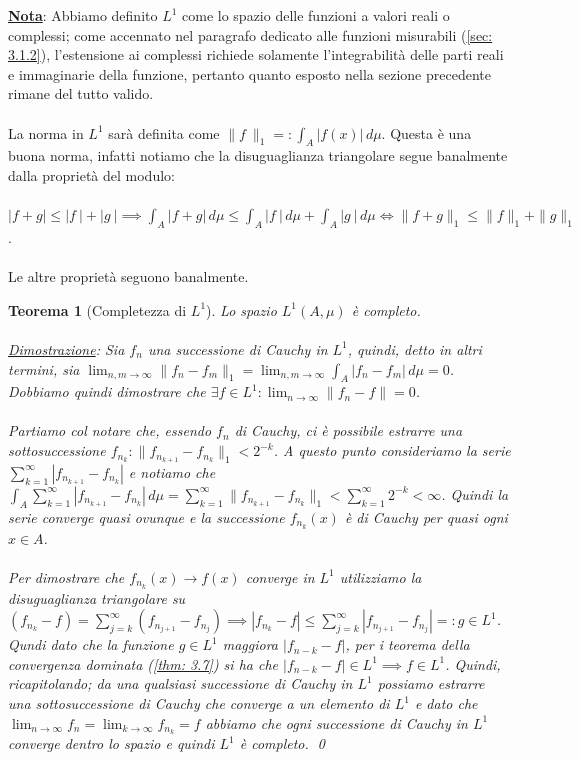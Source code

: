 \documentclass[a4paper,12pt]{report}
\newtheorem{teorema}{Teorema}[chapter]
\newcommand{\lt}{<}
\begin{document}
\underline{\textbf{Nota}}: Abbiamo definito $L^1$ come lo spazio delle funzioni a valori reali o complessi; come accennato nel paragrafo dedicato alle funzioni misurabili (\ref{sec: 3.1.2}), l'estensione ai complessi richiede solamente l'integrabilità delle parti reali e immaginarie della funzione, pertanto quanto esposto nella sezione precedente rimane del tutto valido.
\\
\\La norma in $L^1$ sarà definita come $\|f \ \|_1=:\displaystyle\int_A|f(x) |\,d\mu$. Questa è una buona norma, infatti notiamo che la disuguaglianza triangolare segue banalmente dalla proprietà del modulo: 
\\
\\$|f+g|\leq|f \ |+|g \ | \implies \displaystyle \int_A|f+g|\,d\mu\leq\int_A|f \ |\,d\mu+\int_A|g\ |\,d\mu \iff\|f+g\|_1\leq \|f\|_1+\|g\|_1$.
\\
\\ Le altre proprietà seguono banalmente.

\begin{teorema}[Completezza di $L^1$]\label{thm: 3.8}
    Lo spazio $L^1(A,\mu)$ è completo.
    \\
    \\ \underline{Dimostrazione}: Sia $f_n$ una successione di Cauchy in $L^1$, quindi, detto in altri termini, sia $\displaystyle\lim_{n,m\to\infty}\|f_n-f_m\|_1=\lim_{n,m\to\infty}\int_A|f_n-f_m|\,d\mu=0$. Dobbiamo quindi dimostrare che $\exists f\in L^1 : \displaystyle\lim_{n\to\infty}\|f_n-f\|=0$.
    \\
    \\Partiamo col notare che, essendo $f_n$ di Cauchy, ci è possibile estrarre una sottosuccessione $f_{n_k}: \|f_{n_{k+1}}-f_{n_k}\|_1\lt 2^{-k}$. A questo punto consideriamo la serie $\displaystyle \sum_{k=1}^\infty|f_{n_{k+1}}-f_{n_k}|$ e notiamo che $\displaystyle\int_A\sum_{k=1}^\infty|f_{n_{k+1}}-f_{n_k}|\,d\mu=\sum_{k=1}^\infty\|f_{n_{k+1}}-f_{n_k}\|_1\lt \sum_{k=1}^\infty 2^{-k}\lt \infty$. Quindi la serie converge quasi ovunque e la successione $f_{n_k}(x)$ è di Cauchy per quasi ogni $x\in A$.
    \\
    \\ Per dimostrare che $f_{n_k}(x)\to f(x)$ converge in $L^1$ utilizziamo la disuguaglianza triangolare su $(f_{n_k}-f)=\displaystyle\sum_{j=k}^\infty(f_{n_{j+1}}-f_{n_j})\implies|f_{n_k}-f|\leq\displaystyle\sum_{j=k}^\infty|f_{n_{j+1}}-f_{n_j}|=:g\in L^1$. Qundi dato che la funzione $g\in L^1$ maggiora $|f_{n-k}-f|$, per i teorema della convergenza dominata (\ref{thm: 3.7}) si ha che $|f_{n-k}-f|\in L^1\implies f\in L^1$. Quindi, ricapitolando; da una qualsiasi successione di Cauchy in $L^1$ possiamo estrarre una sottosuccessione di Cauchy che converge a un elemento di $L^1$ e dato che $\displaystyle\lim_{n\to\infty}f_n=\lim_{k\to\infty}f_{n_k}=f$ abbiamo che ogni successione di Cauchy in $L^1$ converge dentro lo spazio e quindi $L^1$ è completo. \qed
\end{teorema}
\end{document}
